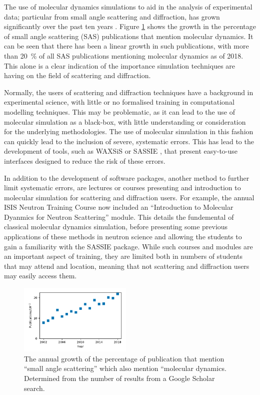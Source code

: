 \documentclass[amsmath,amssymb,twocolumn,superscriptaddress,aps,prl]{revtex4-1}
\begin{document}
The use of molecular dynamics simulations to aid in the analysis of experimental data; particular from small angle scattering and diffraction, has grown significantly over the past ten years \cite{Pan2012,Boldon2015,Hub2018,Ivanovic2018,East2016,Wall2014,Wall2018,Satoh2015}.
Figure \ref{fig:growth} shows the growth in the percentage of small angle scattering (SAS) publications that mention molecular dynamics.
It can be seen that there has been a linear growth in such publications, with more than \SI{20}{\percent} of all SAS publications mentioning molecular dynamics as of 2018.
This alone is a clear indication of the importance simulation techniques are having on the field of scattering and diffraction.

Normally, the users of scattering and diffraction techniques have a background in experimental science, with little or no formalised training in computational modelling techniques.
This may be problematic, as it can lead to the use of molecular simulation as a black-box, with little understanding or consideration for the underlying methodologies.
The use of molecular simulation in this fashion can quickly lead to the inclusion of severe, systematic errors.
This has lead to the development of tools, such as WAXSiS or SASSIE \cite{Chen2014,Knight2015,Perkins2016}, that present easy-to-use interfaces designed to reduce the risk of these errors.

In addition to the development of software packages, another method to further limit systematic errors, are lectures or courses presenting and introduction to molecular simulation for scattering and diffraction users.
For example, the annual ISIS Neutron Training Course now included an ``Introduction to Molecular Dyanmics for Neutron Scattering'' module.
This details the fundemental of classical molecular dynamics simulation, before presenting some previous applications of these methods in neutron science and allowing the students to gain a familiarity with the SASSIE package.
While such courses and modules are an important aspect of training, they are limited both in numbers of students that may attend and location, meaning that not scattering and diffraction users may easily access them.
%
\begin{figure}
\label{fig:growth}
\includegraphics[width=0.48\textwidth]{figures/chem_data_py.pdf}
\caption{The annual growth of the percentage of publication that mention ``small angle scattering'' which also mention ``molecular dynamics. Determined from the number of results from a Google Scholar search.}
\end{figure}
%
\end{document}
